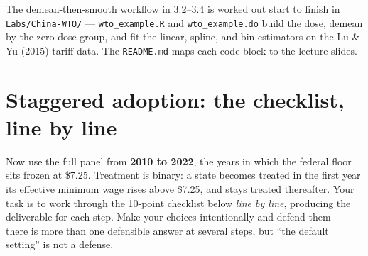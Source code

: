 \documentclass[11pt,a4paper]{article}
\newcommand{\code}[1]{\texttt{\color{ChiantiRed}#1}}
\begin{document}
\begin{helpbox}
The demean-then-smooth workflow in 3.2--3.4 is worked out start to finish in \code{Labs/China-WTO/} --- \code{wto\_example.R} and \code{wto\_example.do} build the dose, demean by the zero-dose group, and fit the linear, spline, and bin estimators on the Lu \& Yu (2015) tariff data. The \code{README.md} maps each code block to the lecture slides.
\end{helpbox}

\section{Staggered adoption: the checklist, line by line}

Now use the full panel from \textbf{2010 to 2022}, the years in which the federal floor sits frozen at \$7.25. Treatment is binary: a state becomes treated in the first year its effective minimum wage rises above \$7.25, and stays treated thereafter. Your task is to work through the 10-point checklist below \emph{line by line}, producing the deliverable for each step. Make your choices intentionally and defend them --- there is more than one defensible answer at several steps, but ``the default setting'' is not a defense.
\end{document}
